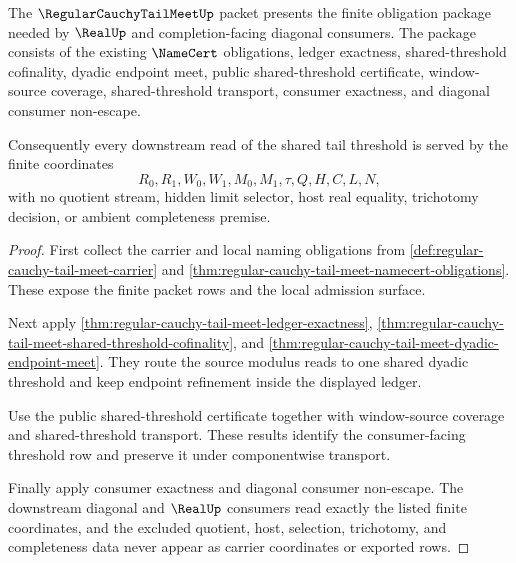 \begin{theorem}
\label{thm:regular-cauchy-tail-meet-obligation-closure-readiness}
The $\RegularCauchyTailMeetUp$ packet presents the finite obligation package needed by $\RealUp$ and completion-facing diagonal consumers. The package consists of the existing $\NameCert$ obligations, ledger exactness, shared-threshold cofinality, dyadic endpoint meet, public shared-threshold certificate, window-source coverage, shared-threshold transport, consumer exactness, and diagonal consumer non-escape.

Consequently every downstream read of the shared tail threshold is served by the finite coordinates
$$
R_0,R_1,W_0,W_1,M_0,M_1,\tau,Q,H,C,L,N,
$$
with no quotient stream, hidden limit selector, host real equality, trichotomy decision, or ambient completeness premise.
\end{theorem}
\begin{proof}
First collect the carrier and local naming obligations from \autoref{def:regular-cauchy-tail-meet-carrier} and \autoref{thm:regular-cauchy-tail-meet-namecert-obligations}. These expose the finite packet rows and the local admission surface.

Next apply \autoref{thm:regular-cauchy-tail-meet-ledger-exactness}, \autoref{thm:regular-cauchy-tail-meet-shared-threshold-cofinality}, and \autoref{thm:regular-cauchy-tail-meet-dyadic-endpoint-meet}. They route the source modulus reads to one shared dyadic threshold and keep endpoint refinement inside the displayed ledger.

Use the public shared-threshold certificate together with window-source coverage and shared-threshold transport. These results identify the consumer-facing threshold row and preserve it under componentwise transport.

Finally apply consumer exactness and diagonal consumer non-escape. The downstream diagonal and $\RealUp$ consumers read exactly the listed finite coordinates, and the excluded quotient, host, selection, trichotomy, and completeness data never appear as carrier coordinates or exported rows.
\end{proof}


